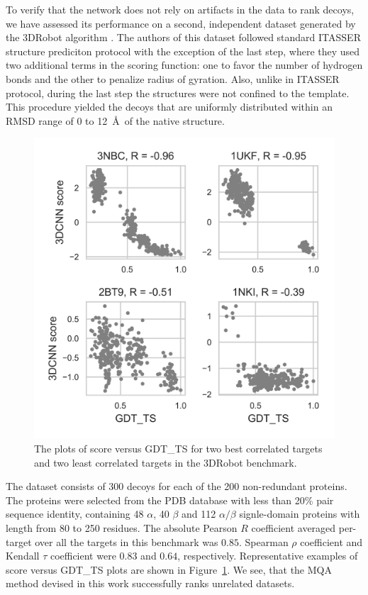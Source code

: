 \documentclass{bioinfo}
\begin{document}
To verify that the network does not rely on artifacts in the data to
rank decoys, we have assessed its performance on a second, independent
dataset generated by the 3DRobot algorithm \citep{deng20163drobot}.
The authors of this dataset followed standard ITASSER structure prediciton protocol
with the exception of the last step, where they used two additional terms in
the scoring function: one to favor the number of hydrogen bonds and the other 
to penalize radius of gyration. Also, unlike in ITASSER protocol, 
during the last step the structures were not confined to the template.
This procedure yielded the decoys that are uniformly distributed
within an RMSD range of 0 to 12~\AA\ of the native structure.
%
\begin{figure}
    \centering
    \includegraphics[width=\linewidth]{image8}
    \caption{The plots of score versus GDT\_TS for two best correlated targets and two
    least correlated targets in the 3DRobot benchmark.}
    \label{Fig:3DRobotBenchmark}
\end{figure}
%
The dataset consists of 300 decoys for each of the 200 non-redundant proteins. The proteins were 
selected from the PDB database with less than 20\% pair sequence identity, containing 48 $\alpha$, 
40 $\beta$ and 112 $\alpha/\beta$ signle-domain proteins with length from 80 to 250 residues. 
The absolute Pearson $R$ coefficient averaged per-target over all the
targets in this benchmark was $0.85$. Spearman $\rho$ coefficient
and Kendall $\tau$ coefficient were $0.83$ and $0.64$, respectively.
Representative examples of score versus GDT\_TS plots are shown in
Figure~\ref{Fig:3DRobotBenchmark}. We see, that the MQA method devised
in this work successfully ranks unrelated datasets.
%
%
\end{document}
